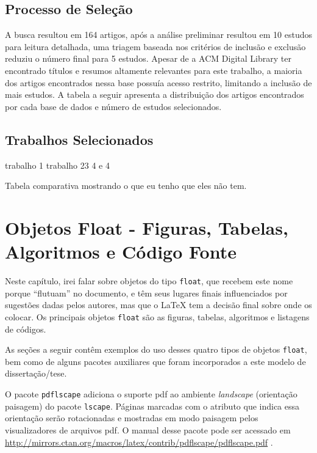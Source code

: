 \section{Processo de Seleção}
A busca resultou em 164 artigos, após a análise preliminar resultou em 10 estudos para leitura detalhada, uma triagem baseada nos critérios de inclusão e exclusão reduziu o número final para 5 estudos. Apesar de a ACM Digital Library ter encontrado títulos e resumos altamente relevantes para este trabalho, a maioria dos artigos encontrados nessa base possuía acesso restrito, limitando a inclusão de mais estudos. A tabela a seguir apresenta a distribuição dos artigos encontrados por cada base de dados e número de estudos selecionados. 



\section{Trabalhos Selecionados}
trabalho 1
trabalho 23 4 e 4

Tabela comparativa mostrando o que eu tenho que eles não tem.


\chapter{Objetos Float - Figuras, Tabelas, Algoritmos e Código Fonte}\label{cap:float}

Neste capítulo, irei falar sobre objetos do tipo \texttt{float}, que recebem este nome porque ``flutuam'' no documento, e têm seus lugares finais influenciados por sugestões dadas pelos autores, mas que o \LaTeX{} tem a decisão final sobre onde os colocar. Os principais objetos \texttt{float} são as figuras, tabelas, algoritmos e listagens de códigos. 

As seções a seguir contêm exemplos do uso desses quatro tipos de objetos \texttt{float}, bem como de alguns pacotes auxiliares que foram incorporados a este modelo de dissertação/tese.

O pacote \texttt{pdflscape} adiciona o suporte \gls{pdf} ao ambiente \textit{landscape} (orientação paisagem) do pacote \texttt{lscape}. Páginas marcadas com o atributo que indica essa orientação serão rotacionadas e mostradas em modo paisagem pelos visualizadores de arquivos \gls{pdf}. O manual desse pacote pode ser acessado em \url{http://mirrors.ctan.org/macros/latex/contrib/pdflscape/pdflscape.pdf} \parencite{pdflscape}.

